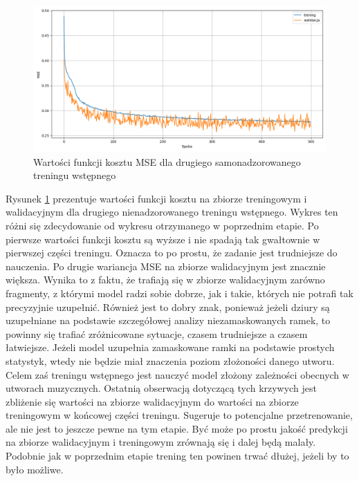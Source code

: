 \begin{figure}
    \centering
    \includegraphics[width=1.0\textwidth]{./images/mae2_loss.png}
    \caption{Wartości funkcji kosztu MSE dla drugiego samonadzorowanego treningu wstępnego}
    \label{fig:mae2_loss}
\end{figure}

Rysunek \ref{fig:mae2_loss} prezentuje wartości funkcji kosztu na zbiorze treningowym i walidacyjnym dla drugiego nienadzorowanego treningu wstępnego. Wykres ten różni się zdecydowanie od wykresu otrzymanego w poprzednim etapie. Po pierwsze wartości funkcji kosztu są wyższe i nie spadają tak gwałtownie w pierwszej części treningu. Oznacza to po prostu, że zadanie jest trudniejsze do nauczenia. Po drugie wariancja MSE na zbiorze walidacyjnym jest znacznie większa. Wynika to z faktu, że trafiają się w zbiorze walidacyjnym zarówno fragmenty, z którymi model radzi sobie dobrze, jak i takie, których nie potrafi tak precyzyjnie uzupełnić. Również jest to dobry znak, ponieważ jeżeli dziury są uzupełniane na podstawie szczegółowej analizy niezamaskowanych ramek, to powinny się trafiać zróżnicowane sytuacje, czasem trudniejsze a czasem łatwiejsze. Jeżeli model uzupełnia zamaskowane ramki na podstawie prostych statystyk, wtedy nie będzie miał znaczenia poziom złożoności danego utworu. Celem zaś treningu wstępnego jest nauczyć model złożony zależności obecnych w utworach muzycznych. Ostatnią obserwacją dotyczącą tych krzywych jest zbliżenie się wartości na zbiorze walidacyjnym do wartości na zbiorze treningowym w końcowej części treningu. Sugeruje to potencjalne przetrenowanie, ale nie jest to jeszcze pewne na tym etapie. Być może po prostu jakość predykcji na zbiorze walidacyjnym i treningowym zrównają się i dalej będą malały. Podobnie jak w poprzednim etapie trening ten powinen trwać dłużej, jeżeli by to było możliwe.

